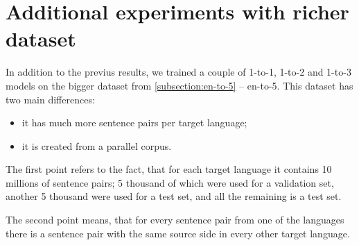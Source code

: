 % 


\section{Additional experiments with richer dataset}
\label{section:experiment_en-to-5}

In addition to the previus results, we trained a couple of
1-to-1, 1-to-2 and 1-to-3 models on the bigger dataset from
\cref{subsection:en-to-5} -- \gls{en-to-5}.
This dataset has two main differences:
\begin{itemize}
	\item it has much more sentence pairs per target language;
	\item it is created from a parallel corpus.
\end{itemize}

The first point refers to the fact, that for each target language
it contains 10 millions of sentence pairs; 5 thousand of which
were used for a validation set, another 5 thousand were used
for a test set, and all the remaining is a test set.

The second point means, that for every sentence pair from
one of the languages there is a sentence pair with the same
source side in every other target language.



